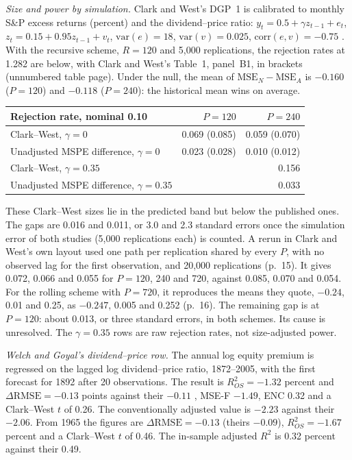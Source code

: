 \begin{qfmethod}
 \emph{Size and power by simulation.} Clark and West's DGP~1 is calibrated to monthly S\&P excess returns (percent) and the dividend--price ratio: $y_t=0.5+\gamma z_{t-1}+e_t$, $z_t=0.15+0.95z_{t-1}+v_t$, $\mathrm{var}(e)=18$, $\mathrm{var}(v)=0.025$, $\mathrm{corr}(e,v)=-0.75$ \citep[eq.~(6.1), p.~13]{clark-west-2006-nber}. With the recursive scheme, $R=120$ and 5,000 replications, the rejection rates at 1.282 are below, with Clark and West's Table~1, panel~B1, in brackets (unnumbered table page). Under the null, the mean of $\mathrm{MSE}_N-\mathrm{MSE}_A$ is $-0.160$ ($P=120$) and $-0.118$ ($P=240$): the historical mean wins on average.
\begin{center}\small
\begin{tabular}{@{}lrr@{}}
\toprule
Rejection rate, nominal 0.10 & $P=120$ & $P=240$ \\
\midrule
Clark--West, $\gamma=0$ & 0.069 (0.085) & 0.059 (0.070) \\
Unadjusted MSPE difference, $\gamma=0$ & 0.023 (0.028) & 0.010 (0.012) \\
Clark--West, $\gamma=0.35$ & & 0.156 \\
Unadjusted MSPE difference, $\gamma=0.35$ & & 0.033 \\
\bottomrule
\end{tabular}
\end{center}
These Clark--West sizes lie in the predicted band but below the published ones. The gaps are 0.016 and 0.011, or 3.0 and 2.3 standard errors once the simulation error of both studies (5,000 replications each) is counted. A rerun in Clark and West's own layout used one path per replication shared by every $P$, with no observed lag for the first observation, and 20,000 replications (p.~15). It gives 0.072, 0.066 and 0.055 for $P=120$, 240 and 720, against 0.085, 0.070 and 0.054. For the rolling scheme with $P=720$, it reproduces the means they quote, $-0.24$, 0.01 and 0.25, as $-0.247$, 0.005 and 0.252 (p.~16). The remaining gap is at $P=120$: about 0.013, or three standard errors, in both schemes. Its cause is unresolved. The $\gamma=0.35$ rows are raw rejection rates, not size-adjusted power.

\emph{Welch and Goyal's dividend--price row.} The annual log equity premium is regressed on the lagged log dividend--price ratio, 1872--2005, with the first forecast for 1892 after 20 observations. The result is $R^2_{OS}=-1.32$ percent and $\Delta\mathrm{RMSE}=-0.13$ points against their $-0.11$ \citep[Table~1, p.~1470]{s7-welch}, MSE-F $-1.49$, ENC 0.32 and a Clark--West $t$ of 0.26. The conventionally adjusted value is $-2.23$ against their $-2.06$. From 1965 the figures are $\Delta\mathrm{RMSE}=-0.13$ (theirs $-0.09$), $R^2_{OS}=-1.67$ percent and a Clark--West $t$ of 0.46. The in-sample adjusted $R^2$ is 0.32 percent against their 0.49.


\end{qfmethod}
